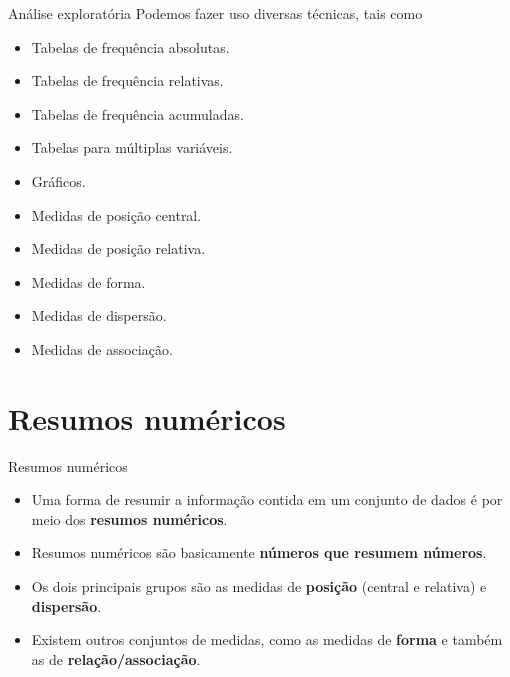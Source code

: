 \documentclass[
  ignorenonframetext,
  serif,
  professionalfont,
  usenames,
  dvipsnames,
  aspectratio = 169]{beamer}
\providecommand{\tightlist}{%
  \setlength{\itemsep}{0pt}\setlength{\parskip}{0pt}}
\renewcommand{\tightlist}{%
  \setlength{\itemsep}{0\baselineskip}
  \setlength{\parskip}{0.25\baselineskip}
}
\def\beginAHalfColumn{\begin{minipage}{0.49\textwidth}}%
\def\endColumns{\end{minipage}}%
\begin{document}
\begin{frame}{Análise exploratória}
\label{anuxe1lise-exploratuxf3ria-5}
Podemos fazer uso diversas técnicas, tais como

\beginAHalfColumn

\begin{itemize}
\tightlist
\item
  Tabelas de frequência absolutas.
\item
  Tabelas de frequência relativas.
\item
  Tabelas de frequência acumuladas.
\item
  Tabelas para múltiplas variáveis.
\item
  Gráficos.
\end{itemize}

\endColumns
\beginAHalfColumn

\begin{itemize}
\tightlist
\item
  Medidas de posição central.
\item
  Medidas de posição relativa.
\item
  Medidas de forma.
\item
  Medidas de dispersão.
\item
  Medidas de associação.
\end{itemize}

\endColumns
\end{frame}

\section{Resumos numéricos}\label{resumos-numuxe9ricos}

\begin{frame}{Resumos numéricos}
\label{resumos-numuxe9ricos-1}
\begin{itemize}
\item
  Uma forma de resumir a informação contida em um conjunto de dados é
  por meio dos \textbf{resumos numéricos}.
\item
  Resumos numéricos são basicamente
  \textbf{números que resumem números}.
\item
  Os dois principais grupos são as medidas de \textbf{posição} (central
  e relativa) e \textbf{dispersão}.
\item
  Existem outros conjuntos de medidas, como as medidas de \textbf{forma}
  e também as de \textbf{relação/associação}.
\end{itemize}
\end{frame}
\end{document}
